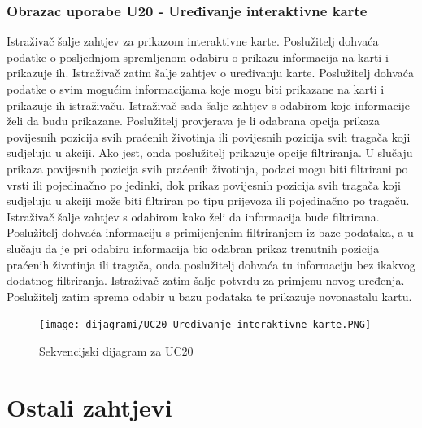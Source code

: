 				\subsubsection{Obrazac uporabe U20 - Uređivanje interaktivne karte}
				Istraživač šalje zahtjev za prikazom interaktivne karte. Poslužitelj dohvaća podatke o posljednjom spremljenom odabiru o prikazu informacija na karti i prikazuje ih. Istraživač zatim šalje zahtjev o uređivanju karte. Poslužitelj dohvaća podatke o svim mogućim informacijama koje mogu biti prikazane na karti i prikazuje ih istraživaču. Istraživač sada šalje zahtjev s odabirom koje informacije želi da budu prikazane. Poslužitelj provjerava je li odabrana opcija prikaza povijesnih pozicija svih praćenih životinja ili povijesnih pozicija svih tragača koji sudjeluju u akciji. Ako jest, onda poslužitelj prikazuje opcije filtriranja. U slučaju prikaza povijesnih pozicija svih praćenih životinja, podaci mogu biti filtrirani po vrsti ili pojedinačno po jedinki, dok prikaz povijesnih pozicija svih tragača koji sudjeluju u akciji može biti filtriran po tipu prijevoza ili pojedinačno po tragaču. Istraživač šalje zahtjev s odabirom kako želi da informacija bude filtrirana. Poslužitelj dohvaća informaciju s primijenjenim filtriranjem iz baze podataka, a u slučaju da je pri odabiru informacija bio odabran prikaz trenutnih pozicija praćenih životinja ili tragača, onda poslužitelj dohvaća tu informaciju bez ikakvog dodatnog filtriranja. Istraživač zatim šalje potvrdu za primjenu novog uređenja. Poslužitelj zatim sprema odabir u bazu podataka te prikazuje novonastalu kartu.
				\eject
				\begin{figure}[H]
					\texttt{[image: dijagrami/UC20-Uređivanje interaktivne karte.PNG]} 
					\centering
					\caption{Sekvencijski dijagram za UC20}
					\label{fig:promjene}
				\end{figure}
				
			\eject
		\section{Ostali zahtjevi}
		

